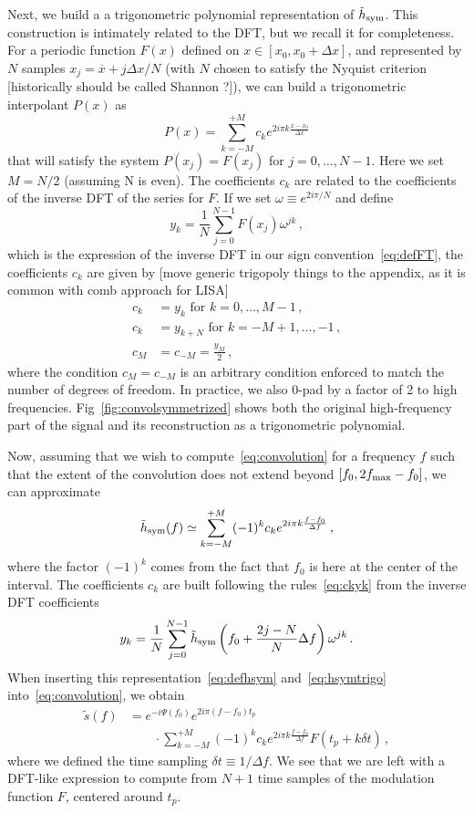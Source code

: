 \documentclass[aps,showpacs,twocolumn,
prd,superscriptaddress,nofootinbib]{revtex4-1}
\newcommand{\be}{\begin{equation}}
\newcommand{\ee}{\end{equation}}
\newcommand{\ov}[1]{\overline{#1}}
\newcommand{\nn}{\nonumber}
\newcommand{\SM}[1]{{\color{Red} #1}}
\begin{document}
Next, we build a a trigonometric polynomial representation of $\tilde{h}_{\rm sym }$. This construction is intimately related to the DFT, but we recall it for completeness. For a periodic function $F(x)$ defined on $x\in [x_{0}, x_{0} + \Delta x]$, and represented by $N$ samples $x_{j} = \ov{x} + j \Delta x/N$ (with $N$ chosen to satisfy the Nyquist criterion \SM{[historically should be called Shannon ?]}), we can build a trigonometric interpolant $P(x)$ as
\be
	P(x) = \sum\limits_{k=-M}^{+M} c_{k} e^{2i\pi k \frac{x-x_{0}}{\Delta x}}
\ee
that will satisfy the system $P(x_{j}) = F(x_{j})$ for $j=0,\dots, N-1$. Here we set $M=N/2$ (assuming N is even). The coefficients $c_{k}$ are related to the coefficients of the inverse DFT of the series for $F$. If we set $\omega \equiv e^{2i\pi/N}$ and define
\be
	y_{k} = \frac{1}{N} \sum\limits_{j=0}^{N-1} F(x_{j}) \omega^{jk} \,,
\ee
which is the expression of the inverse DFT in our sign convention~\eqref{eq:defFT}, the coefficients $c_{k}$ are given by \SM{[move generic trigopoly things to the appendix, as it is common with comb approach for LISA]}
\begin{align}\label{eq:ckyk}
	c_{k} &= y_{k} \text{ for } k=0,\dots, M-1 \,, \nn\\
	c_{k} &= y_{k+N} \text{ for } k=-M+1,\dots, -1 \,, \nn\\
	c_{M} &= c_{-M} = \frac{y_{M}}{2} \,,
\end{align}
where the condition $c_{M} = c_{-M}$ is an arbitrary condition enforced to match the number of degrees of freedom. In practice, we also 0-pad by a factor of 2 to high frequencies. Fig~\ref{fig:convolsymmetrized} shows both the original high-frequency part of the signal and its reconstruction as a trigonometric polynomial.

Now, assuming that we wish to compute~\eqref{eq:convolution} for a frequency $f$ such that the extent of the convolution does not extend beyond $[f_{0}, 2f_{\rm max} - f_{0}]$, we can approximate
\be\label{eq:hsymtrigo}
	\tilde{h}_{\rm sym } (f) \simeq \sum\limits_{k=-M}^{+M} (-1)^{k} c_{k} e^{2i\pi k \frac{f-f_{0}}{\Delta f}} \,,
\ee
where the factor $(-1)^{k}$ comes from the fact that $f_{0}$ is here at the center of the interval. The coefficients $c_{k}$ are built following the rules~\eqref{eq:ckyk} from the inverse DFT coefficients
\be\label{eq:ykDFT}
	y_{k} = \frac{1}{N} \sum\limits_{j=0}^{N-1} \tilde{h}_{\rm sym}\left( f_{0} + \frac{2j - N}{N} \Delta f \right) \omega^{jk} \,.
\ee
When inserting this representation~\eqref{eq:defhsym} and~\eqref{eq:hsymtrigo} into~\eqref{eq:convolution}, we obtain
\begin{align}\label{eq:resultdirectconvol}
	\tilde{s}(f) &= e^{-i \Psi(f_{0})} e^{2i\pi (f-f_{0}) t_{p}} \nn\\
	& \qquad \cdot\sum\limits_{k=-M}^{+M} (-1)^{k} c_{k} e^{2i\pi k \frac{f-f_{0}}{\Delta f}} F(t_{p} + k\delta t) \,, 
\end{align}
where we defined the time sampling $\delta t \equiv 1/\Delta f$. We see that we are left with a DFT-like expression to compute from $N+1$ time samples of the modulation function $F$, centered around $t_{p}$.
\end{document}
